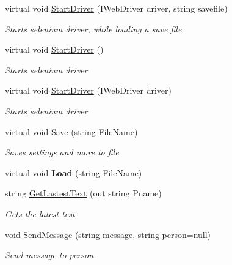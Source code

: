 \begin{DoxyCompactItemize}
virtual void \hyperlink{class_web_whatsapp_a_p_i_1_1_base_class_aaa7e5947e31c9f475c95c9818f6c3a00}{Start\+Driver} (I\+Web\+Driver driver, string savefile)
\begin{DoxyCompactList}\small\item\em Starts selenium driver, while loading a save file \end{DoxyCompactList}\item 
virtual void \hyperlink{class_web_whatsapp_a_p_i_1_1_base_class_a8108d46b4176fc74fb49626e8122df88}{Start\+Driver} ()
\begin{DoxyCompactList}\small\item\em Starts selenium driver \end{DoxyCompactList}\item 
virtual void \hyperlink{class_web_whatsapp_a_p_i_1_1_base_class_a3a26ad50a4ba508f1162402bc00e128b}{Start\+Driver} (I\+Web\+Driver driver)
\begin{DoxyCompactList}\small\item\em Starts selenium driver \end{DoxyCompactList}\item 
virtual void \hyperlink{class_web_whatsapp_a_p_i_1_1_base_class_a03ddf85cb437ebabb7f3444d856bd8a7}{Save} (string File\+Name)
\begin{DoxyCompactList}\small\item\em Saves settings and more to file \end{DoxyCompactList}\item 
\mbox{\label{class_web_whatsapp_a_p_i_1_1_base_class_a6e8b8b0fbf62bffb3e153f4003280626}} 
virtual void {\bfseries Load} (string File\+Name)
\item 
string \hyperlink{class_web_whatsapp_a_p_i_1_1_base_class_a9b62276c558e7e81cf507af854cdc0b2}{Get\+Lastest\+Text} (out string Pname)
\begin{DoxyCompactList}\small\item\em Gets the latest test \end{DoxyCompactList}\item 
void \hyperlink{class_web_whatsapp_a_p_i_1_1_base_class_a394d26a4172531e8149b5e084917dc99}{Send\+Message} (string message, string person=null)
\begin{DoxyCompactList}\small\item\em Send message to person \end{DoxyCompactList}\end{DoxyCompactItemize}
